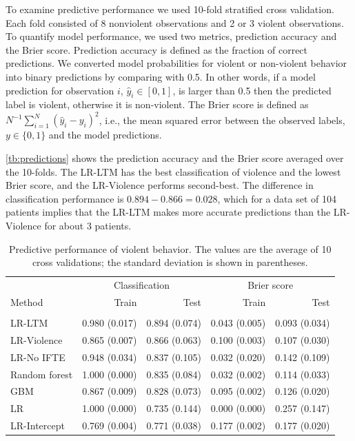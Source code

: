 \documentclass[a4paper,11pt]{article}
\begin{document}
To examine predictive performance we used 10-fold stratified cross validation.
Each fold consisted of 8 nonviolent observations and 2 or 3 violent observations.
To quantify model performance, we used two metrics, prediction accuracy and the Brier score.
Prediction accuracy is defined as the fraction of correct predictions.
We converted model probabilities for violent or non-violent behavior into binary predictions by comparing with 0.5. In other words, if a model prediction for observation $i$, $\hat{y}_i\in [0, 1]$, is larger than 0.5 then the predicted label is violent, otherwise it is non-violent.
The Brier score is defined as $N^{-1}\sum_{i=1}^N\left(\hat{y}_i-y_{i}\right)^2$, i.e., the mean squared error between the observed labels, $y\in\{0,1\}$ and the model predictions.

\autoref{tb:predictions} shows the prediction accuracy and the Brier score averaged over the 10-folds.
The LR-LTM has the best classification of violence and the lowest Brier score, and the LR-Violence performs second-best.
The difference in classification performance is $0.894 - 0.866 = 0.028$, which for a data set of 104 patients implies that the LR-LTM makes more accurate predictions than the LR-Violence for about 3 patients.




\begin{table}[!ht]
    \caption{Predictive performance of violent behavior. The values are the average of 10 cross validations; the standard deviation is shown in parentheses.}
    \label{tb:predictions}
    \centering
    \begin{tabular}{lrrrr}
        \toprule
        & \multicolumn{2}{c}{Classification} & \multicolumn{2}{c}{Brier score}\\
        \cmidrule(lr){2-3}  \cmidrule(lr){4-5}
        Method & Train & Test & Train & Test \\
        \midrule \\
        LR-LTM & 0.980 (0.017) & 0.894 (0.074) & 0.043 (0.005) & 0.093 (0.034) \\ 
        LR-Violence & 0.865 (0.007) & 0.866 (0.063) & 0.100 (0.003) & 0.107 (0.030) \\ 
        LR-No IFTE & 0.948 (0.034) & 0.837 (0.105) & 0.032 (0.020) & 0.142 (0.109) \\ 
        Random forest & 1.000 (0.000) & 0.835 (0.084) & 0.032 (0.002) & 0.114 (0.033) \\ 
        GBM & 0.867 (0.009) & 0.828 (0.073) & 0.095 (0.002) & 0.126 (0.020) \\ 
        LR & 1.000 (0.000) & 0.735 (0.144) & 0.000 (0.000) & 0.257 (0.147) \\ 
        LR-Intercept & 0.769 (0.004) & 0.771 (0.038) & 0.177 (0.002) & 0.177 (0.020) \\ 
        \bottomrule
    \end{tabular}
\end{table}
\end{document}
